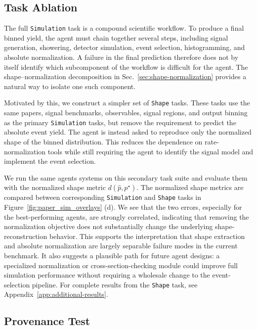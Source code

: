 \documentclass{article}
\begin{document}
\subsection{Task Ablation}
\label{sec:task-ablation}

The full \texttt{Simulation} task is a compound scientific workflow. To produce a final binned yield, the agent must chain together several steps, including signal generation, showering, detector simulation, event selection, histogramming, and absolute normalization. A failure in the final prediction therefore does not by itself identify which subcomponent of the workflow is difficult for the agent. The shape--normalization decomposition in Sec.~\ref{sec:shape-normalization} provides a natural way to isolate one such component.

Motivated by this, we construct a simpler set of \texttt{Shape} tasks. These tasks use the same papers, signal benchmarks, observables, signal regions, and output binning as the primary \texttt{Simulation} tasks, but remove the requirement to predict the absolute event yield. The agent is instead asked to reproduce only the normalized shape of the binned distribution. This reduces the dependence on rate-normalization tools while still requiring the agent to identify the signal model and implement the event selection.

We run the same agents systems on this secondary task suite and evaluate them with the normalized shape metric \(d(\hat p,p^\star)\). The normalized shape metrics are compared between corresponding \texttt{Simulation}  and \texttt{Shape} tasks in Figure~\ref{fig:paper_sim_overlays} (d). We see that the two errors, especially for the best-performing agents, are strongly correlated, indicating that removing the normalization objective does not substantially change the underlying shape-reconstruction behavior. This supports the interpretation that shape extraction and absolute normalization are largely separable failure modes in the current benchmark. It also suggests a plausible path for future agent designs: a specialized normalization or cross-section-checking module could improve full simulation performance without requiring a wholesale change to the event-selection pipeline. For complete results from the \texttt{Shape} task, see Appendix~\ref{app:additional-results}.

\subsection{Provenance Test}
\label{sec:provenance_test}
\end{document}
